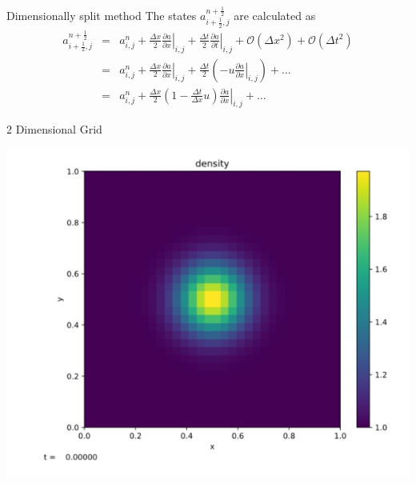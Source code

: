 \documentclass[11pt]{beamer}
\begin{document}
\begin{frame}[fragile]{Dimensionally split method}
The states
$a_{i+\frac{1}{2},j}^{n+\frac{1}{2}}$ are calculated as
\begin{eqnarray}
a_{i+\frac{1}{2},j}^{n+\frac{1}{2}} &=& a_{i,j}^n + 
  \frac{\Delta x}{2} \left .\frac{\partial a}{\partial x} \right |_{i,j} + 
  \frac{\Delta t}{2} \left .\frac{\partial a}{\partial t} \right |_{i,j} + 
  \mathcal{O}(\Delta x^2) + \mathcal{O}(\Delta t^2) \nonumber \\
 &=& a_{i,j}^n + 
   \frac{\Delta x}{2} \left .\frac{\partial a}{\partial x} \right |_{i,j} + 
   \frac{\Delta t}{2} \left ( 
   - u \left .\frac{\partial a}{\partial x} \right |_{i,j} \right
   ) + \ldots \nonumber \\
    &=& a_{i,j}^n + 
   \frac{\Delta x}{2} \left ( 1 - \frac{\Delta t}{\Delta x} u \right ) 
   \left .\frac{\partial a}{\partial x} \right |_{i,j} +
   \ldots \label{eq:statels}
\end{eqnarray}
\end{frame}

\begin{frame}[fragile]{2 Dimensional Grid}
\begin{center}
\includegraphics[scale=0.3]{Gaussian}
\end{center}
\end{frame}
\end{document}
